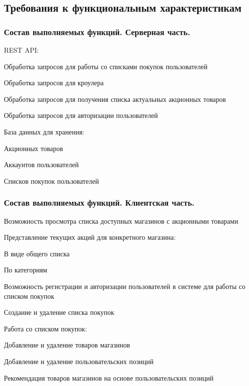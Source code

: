 \subsection{Требования к функциональным характеристикам}

\subsubsection{Состав выполняемых функций. Серверная часть.}
\begin{my_enumerate}
  \item REST API:
    \begin{my_enumerate}
      \item Обработка запросов для работы со списками покупок пользователей
      \item Обработка запросов для кроулера
      \item Обработка запросов для получения списка актуальных акционных
        товаров
      \item Обработка запросов для авторизации пользователей
    \end{my_enumerate}
  \item База данных для хранения:
    \begin{my_enumerate}
      \item Акционных товаров
      \item Аккаунтов пользователей
      \item Списков покупок пользователей
    \end{my_enumerate}
\end{my_enumerate}

\subsubsection{Состав выполняемых функций. Клиентская часть.}
\begin{my_enumerate}
  \item Возможность просмотра списка доступных магазинов с акционными товарами
  \item Представление текущих акций для конкретного магазина:
    \begin{my_enumerate}
      \item В виде общего списка
      \item По категориям
    \end{my_enumerate}
  \item Возможность регистрации и авторизации пользователей в системе для
    работы со списком покупок
  \item Создание и удаление списка покупок
  \item Работа со списком покупок:
    \begin{my_enumerate}
      \item Добавление и удаление товаров магазинов
      \item Добавление и удаление пользовательских позиций
      \item Рекомендация товаров магазинов на основе пользовательских позиций 
    \end{my_enumerate}
\end{my_enumerate}

